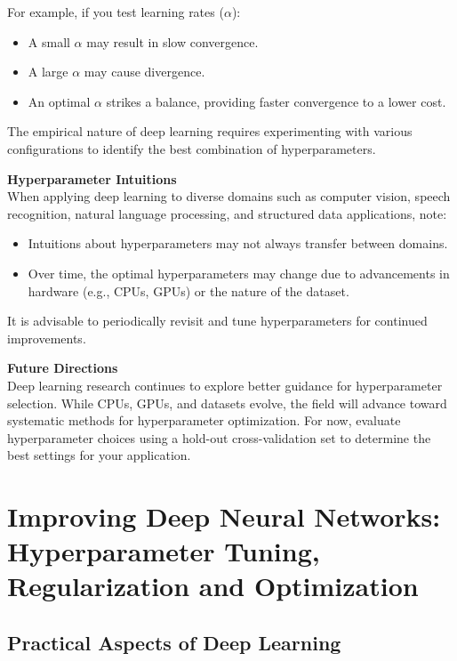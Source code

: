\documentclass[letterpaper,12pt,notitlepage,twoside]{report}
\begin{document}
For example, if you test learning rates (\( \alpha \)):
\begin{itemize}[nosep]
    \item A small \( \alpha \) may result in slow convergence.
    \item A large \( \alpha \) may cause divergence.
    \item An optimal \( \alpha \) strikes a balance, providing faster convergence to a lower cost.
\end{itemize}

The empirical nature of deep learning requires experimenting with various configurations to identify the best combination of hyperparameters.

\textbf{Hyperparameter Intuitions} \\
When applying deep learning to diverse domains such as computer vision, speech recognition, natural language processing, and structured data applications, note:
\begin{itemize}[nosep]
    \item Intuitions about hyperparameters may not always transfer between domains.
    \item Over time, the optimal hyperparameters may change due to advancements in hardware (e.g., CPUs, GPUs) or the nature of the dataset.
\end{itemize}

It is advisable to periodically revisit and tune hyperparameters for continued improvements.

\textbf{Future Directions} \\
Deep learning research continues to explore better guidance for hyperparameter selection. While CPUs, GPUs, and datasets evolve, the field will advance toward systematic methods for hyperparameter optimization. For now, evaluate hyperparameter choices using a hold-out cross-validation set to determine the best settings for your application.

\chapter{Improving Deep Neural Networks: Hyperparameter Tuning, Regularization and Optimization} \label{ch:2}

\section{Practical Aspects of Deep Learning}
\end{document}
